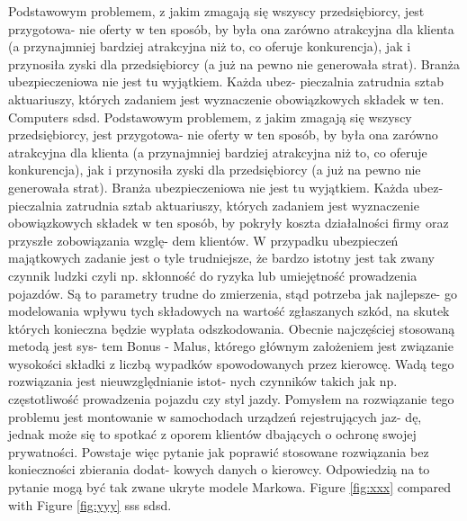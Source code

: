 \documentclass[a4paper, 11pt, onecolumn, openany, titlepage]{report}
\theoremstyle{default_theorem_style}\newtheorem{theorem}{Theorem}
\theoremstyle{default_theorem_style}\newtheorem{definition}{Definition}
\begin{document}
Podstawowym problemem, z jakim zmagają się wszyscy przedsiębiorcy, jest przygotowa- nie oferty w ten sposób, by była ona zarówno atrakcyjna dla klienta (a przynajmniej bardziej atrakcyjna niż to, co oferuje konkurencja), jak i przynosiła zyski dla przedsiębiorcy (a już na pewno nie generowała strat). Branża ubezpieczeniowa nie jest tu wyjątkiem. Każda ubez- pieczalnia zatrudnia sztab aktuariuszy, których zadaniem jest wyznaczenie obowiązkowych składek w ten.
Computers \cite{einstein} sdsd.
Podstawowym problemem, z jakim zmagają się wszyscy przedsiębiorcy, jest przygotowa- nie oferty w ten sposób, by była ona zarówno atrakcyjna dla klienta (a przynajmniej bardziej atrakcyjna niż to, co oferuje konkurencja), jak i przynosiła zyski dla przedsiębiorcy (a już na pewno nie generowała strat). Branża ubezpieczeniowa nie jest tu wyjątkiem. Każda ubez- pieczalnia zatrudnia sztab aktuariuszy, których zadaniem jest wyznaczenie obowiązkowych składek w ten sposób, by pokryły koszta działalności firmy oraz przyszłe zobowiązania wzglę- dem klientów. W przypadku ubezpieczeń majątkowych zadanie jest o tyle trudniejsze, że bardzo istotny jest tak zwany czynnik ludzki czyli np. skłonność do ryzyka lub umiejętność prowadzenia pojazdów. Są to parametry trudne do zmierzenia, stąd potrzeba jak najlepsze- go modelowania wpływu tych składowych na wartość zgłaszanych szkód, na skutek których konieczna będzie wypłata odszkodowania. Obecnie najczęściej stosowaną metodą jest sys- tem Bonus - Malus, którego głównym założeniem jest związanie wysokości składki z liczbą wypadków spowodowanych przez kierowcę. Wadą tego rozwiązania jest nieuwzględnianie istot- nych czynników takich jak np. częstotliwość prowadzenia pojazdu czy styl jazdy. Pomysłem na rozwiązanie tego problemu jest montowanie w samochodach urządzeń rejestrujących jaz- dę, jednak może się to spotkać z oporem klientów dbających o ochronę swojej prywatności. Powstaje więc pytanie jak poprawić stosowane rozwiązania bez konieczności zbierania dodat- kowych danych o kierowcy. Odpowiedzią na to pytanie mogą być tak zwane ukryte modele Markowa.
Figure \ref{fig:xxx} compared with Figure \ref{fig:yyy} sss \cite{einstein} sdsd.
\end{document}
